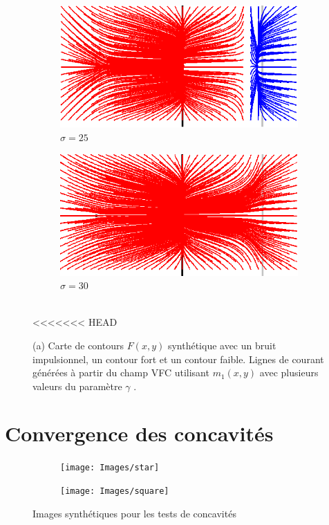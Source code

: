 \begin{figure}[!h]
   \begin{subfigure}[c]{.5\linewidth}
     \centering
     \includegraphics[width=\textwidth]{Chapters/Images/m2_sigma_25.png}
     \caption{$\sigma=25$}
   \end{subfigure}
   \begin{subfigure}[c]{.5\linewidth}
     \centering
     \includegraphics[width=\textwidth]{Chapters/Images/m2_sigma_30.png}
     \caption{$\sigma=30$}
   \end{subfigure}\\
   
<<<<<<< HEAD
   \caption{(a) Carte de contours $F(x,y)$ synthétique avec un bruit impulsionnel, un contour fort et un contour faible. Lignes de courant générées à partir du champ VFC utilisant $m_1(x,y)$ avec plusieurs valeurs du paramètre $\gamma$ .}
   \label{fig:synthetic_map}
\end{figure}

\section{Convergence des concavités}
\begin{figure}[H]

\begin{subfigure}[c]{.5\textwidth}
\centering
\texttt{[image: Images/star]}
\caption{}
\end{subfigure}
\begin{subfigure}[c]{.5\textwidth}
\centering
\texttt{[image: Images/square]}
\caption{}
\end{subfigure}
\caption{Images synthétiques pour les tests de concavités}
\label{fig:ann_synthetic_star_square}
\end{figure}

